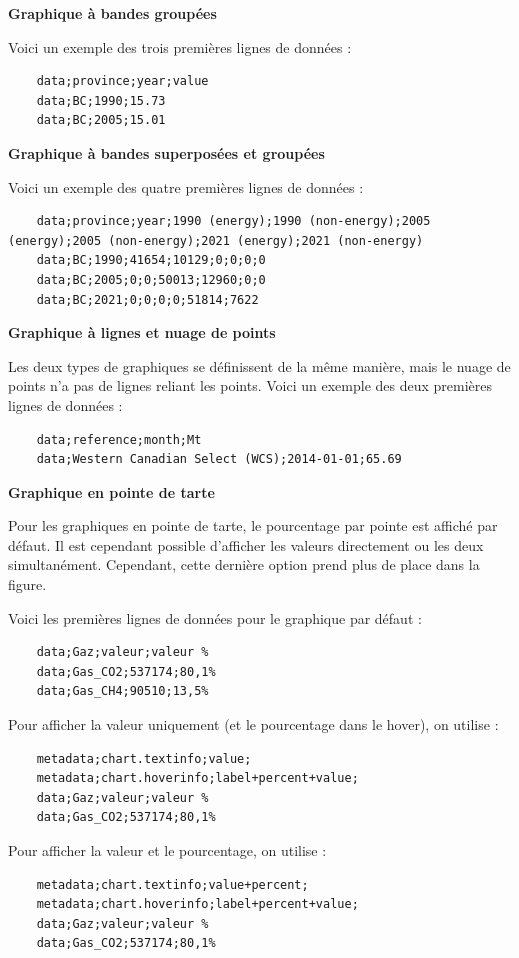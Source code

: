 \documentclass[11pt]{article}
\begin{document}
\textbf{Graphique à bandes groupées}

Voici un exemple des trois premières lignes de données :
\begin{lstlisting}
    data;province;year;value
    data;BC;1990;15.73
    data;BC;2005;15.01
\end{lstlisting}

\textbf{Graphique à bandes superposées et groupées}

Voici un exemple des quatre premières lignes de données :
\begin{lstlisting}
    data;province;year;1990 (energy);1990 (non-energy);2005 (energy);2005 (non-energy);2021 (energy);2021 (non-energy)
    data;BC;1990;41654;10129;0;0;0;0
    data;BC;2005;0;0;50013;12960;0;0
    data;BC;2021;0;0;0;0;51814;7622
\end{lstlisting}

\textbf{Graphique à lignes et nuage de points}

Les deux types de graphiques se définissent de la même manière, mais le nuage de points n'a pas de lignes reliant les points. Voici un exemple des deux premières lignes de données :
\begin{lstlisting}
    data;reference;month;Mt
    data;Western Canadian Select (WCS);2014-01-01;65.69
\end{lstlisting}

\textbf{Graphique en pointe de tarte}

Pour les graphiques en pointe de tarte, le pourcentage par pointe est affiché par défaut. Il est cependant possible d'afficher les valeurs directement ou les deux simultanément. Cependant, cette dernière option prend plus de place dans la figure.

Voici les premières lignes de données pour le graphique par défaut :
\begin{lstlisting}
    data;Gaz;valeur;valeur %
    data;Gas_CO2;537174;80,1%
    data;Gas_CH4;90510;13,5%
\end{lstlisting}

Pour afficher la valeur uniquement (et le pourcentage dans le hover), on utilise :
\begin{lstlisting}
    metadata;chart.textinfo;value;
    metadata;chart.hoverinfo;label+percent+value;
    data;Gaz;valeur;valeur %
    data;Gas_CO2;537174;80,1%
\end{lstlisting}

Pour afficher la valeur et le pourcentage, on utilise :
\begin{lstlisting}
    metadata;chart.textinfo;value+percent;
    metadata;chart.hoverinfo;label+percent+value;
    data;Gaz;valeur;valeur %
    data;Gas_CO2;537174;80,1%
\end{lstlisting}
\end{document}
